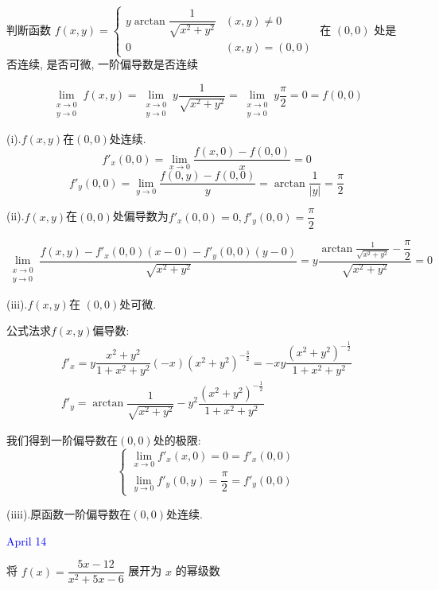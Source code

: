 \begin{example}[][Exam: 30.2.12]
	判断函数 $f(x,y) = 
	\begin{cases}
		y\arctan\dfrac{1}{\sqrt{x^2+y^2}} & (x,y)\neq 0\\
		0 & (x,y)=(0,0)  
	\end{cases}$ 在 $(0,0)$ 处是否连续, 是否可微, 一阶偏导数是否连续
\end{example}

\begin{solution}
	$$\lim\limits_{\substack{x\to 0\\ y\to 0}}f(x,y)=\lim\limits_{\substack{x\to 0\\ y\to 0}}y\frac{1}{\sqrt{x^2+y^2}}=\lim\limits_{\substack{x\to 0\\ y\to 0}}y\frac{\pi}{2}=0=f(0,0)$$
	
	(i).$f(x,y)$在$(0,0)$处连续.
	$$f'_{x}(0,0)=\lim\limits_{x\to 0}\frac{f(x,0)-f(0,0)}{x}=0$$
	$$f'_{y}(0,0)=\lim\limits_{y\to 0}\frac{f(0,y)-f(0,0)}{y}=\arctan\frac{1}{|y|}=\frac{\pi}{2}$$
	
	(ii).$f(x,y)$在$(0,0)$处偏导数为$f'_{x}(0,0)=0,f'_{y}(0,0)=\dfrac{\pi}{2}$
	
	$$\lim\limits_{\substack{x\to 0\\ y\to 0}}\frac{f(x,y)-f'_{x}(0,0)(x-0)-f'_{y}(0,0)(y-0)}{\sqrt{x^2+y^2}}=y\dfrac{\arctan\frac{1}{\sqrt{x^2+y^2}}-\dfrac{\pi}{2}}{\sqrt{x^2+y^2}}=0$$
	
	(iii).$f(x,y)$在 $(0,0)$处可微.
	
	公式法求$f(x,y)$偏导数: 
	$$\begin{array}{l}
		f'_{x}=y\dfrac{x^2+y^2}{1+x^2+y^2}(-x)(x^2+y^2)^{-\frac{3}{2}}=-xy\dfrac{(x^2+y^2)^{-\frac{1}{2}}}{1+x^2+y^2}\\
		f'_{y}=\arctan\dfrac{1}{\sqrt{x^2+y^2}}-y^2\dfrac{(x^2+y^2)^{-\frac{1}{2}}}{1+x^2+y^2}
	\end{array}$$
	
	我们得到一阶偏导数在$(0,0)$处的极限: 
	$$\left\lbrace \begin{array}{l}
		\lim\limits_{x\to0}f'_{x}(x,0)=0=f'_{x}(0,0)\\
		\lim\limits_{y\to0}f'_{y}(0,y)=\dfrac{\pi}{2}=f'_{y}(0,0)
	\end{array}\right. $$
	
	(iiii).原函数一阶偏导数在$(0,0)$处连续.
\end{solution}


\textcolor{blue}{April 14}

\begin{example}[][Exam: 30.2.13]
	将 $f(x)=\dfrac{5x-12}{x^2+5x-6}$ 展开为 $x$ 的幂级数
\end{example}

